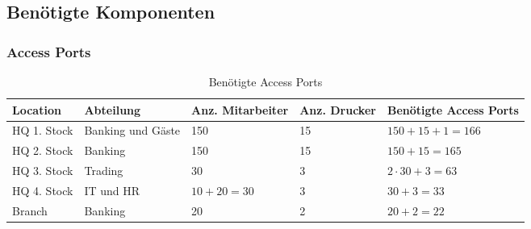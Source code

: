 \subsection{Benötigte Komponenten}
\subsubsection{Access Ports}
\begin{table}[h]
	\centering
	\begin{tabu} to \linewidth {l l l l l}
		\toprule 
		Location & Abteilung & Anz. Mitarbeiter & Anz. Drucker & Benötigte Access Ports \\
		\midrule
		HQ 1. Stock & Banking und Gäste & 150 & 15 & $150 + 15 + 1 = 166$ \\ 
		HQ 2. Stock & Banking & 150 & 15 & $150 + 15 = 165$ \\
		HQ 3. Stock & Trading & 30 & 3 & $2 \cdot 30 + 3 = 63$ \\ 
		HQ 4. Stock & IT und HR & $10 + 20 = 30$ & 3 & $30 + 3 = 33$\\
		Branch  & Banking & 20 & 2 & $20 + 2 = 22$\\
		\bottomrule 
	\end{tabu} 
	\label{tbl:require_access_ports}
	\caption{Benötigte Access Ports}
\end{table}

